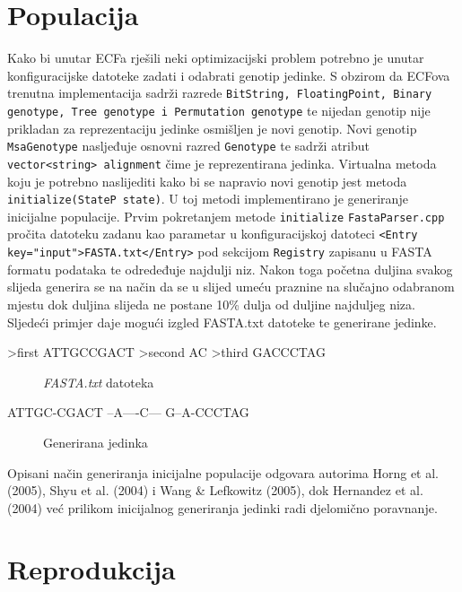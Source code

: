 \documentclass[times, utf8, zavrsni, numeric]{fer}
\begin{document}
\section{Populacija}
Kako bi unutar ECFa rješili neki optimizacijski problem potrebno je unutar konfiguracijske datoteke zadati i odabrati genotip jedinke. S obzirom da ECFova trenutna implementacija sadrži razrede \texttt{BitString, FloatingPoint, Binary genotype,  Tree genotype i Permutation genotype} te nijedan genotip nije prikladan za reprezentaciju jedinke osmišljen je novi genotip. Novi genotip \texttt{MsaGenotype} nasljeđuje osnovni razred \texttt{Genotype} te sadrži atribut \texttt{vector<string> alignment} čime je reprezentirana jedinka.
Virtualna metoda koju je potrebno naslijediti kako bi se napravio novi genotip jest metoda \texttt{initialize(StateP state)}. U toj metodi implementirano je generiranje inicijalne populacije.
Prvim pokretanjem metode \texttt{initialize} \texttt{FastaParser.cpp} pročita datoteku zadanu kao parametar u konfiguracijskoj datoteci \texttt{<Entry key="input">FASTA.txt</Entry>} pod sekcijom \texttt{Registry} zapisanu u FASTA formatu podataka te odredeđuje najdulji niz. Nakon toga početna duljina svakog slijeda generira se na način da se u slijed umeću praznine na slučajno odabranom mjestu dok duljina slijeda ne postane 10\% dulja od duljine najduljeg niza. Sljedeći primjer daje mogući izgled FASTA.txt datoteke te generirane jedinke.


\begin{verbbox}
	>first
	ATTGCCGACT
	>second
	AC
	>third
	GACCCTAG
\end{verbbox}
\begin{figure}[ht]
\centering
\theverbbox
\caption{\textit{FASTA.txt} datoteka}
\end{figure}

\begin{verbbox}
	ATTGC-CGACT
	--A----C---
	G--A-CCCTAG
\end{verbbox}
\begin{figure}[ht]
	\centering
	\theverbbox
	\caption{Generirana jedinka}
\end{figure}
Opisani način generiranja inicijalne populacije odgovara autorima Horng et al. (2005), Shyu et al. (2004) i Wang \& Lefkowitz (2005), dok 
Hernandez et al. (2004) već prilikom inicijalnog generiranja jedinki radi djelomično poravnanje.

\section{Reprodukcija}
\end{document}
